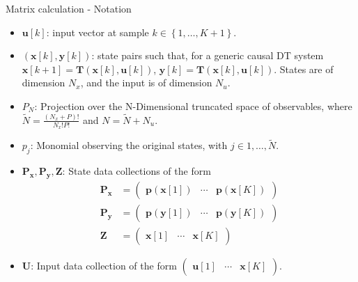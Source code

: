 \documentclass{beamer}
\begin{document}
\begin{frame}{Matrix calculation - Notation}
    \begin{itemize}
        \item $\mathbf{u}\left[k\right]$: input vector at sample $k \in \left\{1,\dots,K+1\right\}$.
        \item $\left(\mathbf{x}\left[k\right],\mathbf{y}\left[k\right]\right)$: state pairs such that, for a generic causal DT system $\mathbf{x}\left[k+1\right] = \mathbf{T}(\mathbf{x}\left[k\right] , \mathbf{u}\left[k\right])$, $\mathbf{y}\left[k\right] = \mathbf{T}(\mathbf{x}\left[k\right], \mathbf{u}\left[k\right])$. States are of dimension $N_x$, and the input is of dimension $N_u$.
        \item $P_N$: Projection over the N-Dimensional truncated space of observables, where $\tilde{N} = \frac{\left(N_x + P\right)!}{N_x! P!}$ and $N = \tilde{N} + N_u$.
        \item $p_j$: Monomial observing the original states, with $j \in {1,\dots,\tilde{N}}$.
        \item $\mathbf{P_x},\mathbf{P_y},\mathbf{Z}$: State data collections of the form
            \begin{align*}
                \mathbf{P_x} &= 
                \begin{pmatrix}
                    \mathbf{p}\left(\mathbf{x}\left[1\right]\right)   &
                    \cdots  &
                    \mathbf{p}\left(\mathbf{x}\left[K\right]\right)
                \end{pmatrix}
                \\
                \mathbf{P_y} &= 
                \begin{pmatrix}
                    \mathbf{p}\left(\mathbf{y}\left[1\right]\right)   &
                    \cdots  &
                    \mathbf{p}\left(\mathbf{y}\left[K\right]\right)
                \end{pmatrix}
                \\
                \mathbf{Z} &= 
                \begin{pmatrix}
                    \mathbf{x}\left[1\right]    &
                    \cdots  &
                    \mathbf{x}\left[K\right]
                \end{pmatrix}
            \end{align*}
        \item $\mathbf{U}$: Input data collection of the form $\begin{pmatrix} \mathbf{u}\left[1\right] & \cdots & \mathbf{x}\left[K\right] \end{pmatrix}$.
    \end{itemize}
\end{frame}
\end{document}
